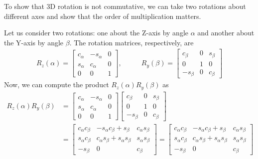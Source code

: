 To show that 3D rotation is not commutative, we can take two rotations about different axes and show that the order of multiplication matters.

Let us consider two rotations: one about the Z-axis by angle \( \alpha \) and another about the Y-axis by angle \( \beta \).
The rotation matrices, respectively, are
\begin{align*}
    R_z(\alpha) =
    \begin{bmatrix}
        c_{\alpha} & -s_{\alpha} & 0 \\
        s_{\alpha} & c_{\alpha}  & 0 \\
        0          & 0           & 1
    \end{bmatrix}
    , & \qquad
    R_y(\beta) =
    \begin{bmatrix}
        c_{\beta}  & 0 & s_{\beta} \\
        0          & 1 & 0         \\
        -s_{\beta} & 0 & c_{\beta}
    \end{bmatrix}
\end{align*}
Now, we can compute the product \( R_z(\alpha)R_y(\beta) \) as
\begin{align*}
    R_z(\alpha)R_y(\beta)
     & =
    \begin{bmatrix}
        c_{\alpha} & -s_{\alpha} & 0 \\
        s_{\alpha} & c_{\alpha}  & 0 \\
        0          & 0           & 1
    \end{bmatrix}
    \begin{bmatrix}
        c_{\beta}  & 0 & s_{\beta} \\
        0          & 1 & 0         \\
        -s_{\beta} & 0 & c_{\beta}
    \end{bmatrix}
    \\ & =
    \begin{bmatrix}
        c_{\alpha}c_{\beta} & -s_{\alpha}c_{\beta} + s_{\beta}          & c_{\alpha}s_{\beta} \\
        s_{\alpha}c_{\beta} & c_{\alpha}s_{\beta} + s_{\alpha}s_{\beta} & s_{\alpha}s_{\beta} \\
        -s_{\beta}          & 0                                         & c_{\beta}
    \end{bmatrix}
    =
    \begin{bmatrix}
        c_{\alpha}c_{\beta} & -s_{\alpha}c_{\beta} + s_{\beta}          & c_{\alpha}s_{\beta} \\
        s_{\alpha}c_{\beta} & c_{\alpha}s_{\beta} + s_{\alpha}s_{\beta} & s_{\alpha}s_{\beta} \\
        -s_{\beta}          & 0                                         & c_{\beta}
    \end{bmatrix}
\end{align*}
